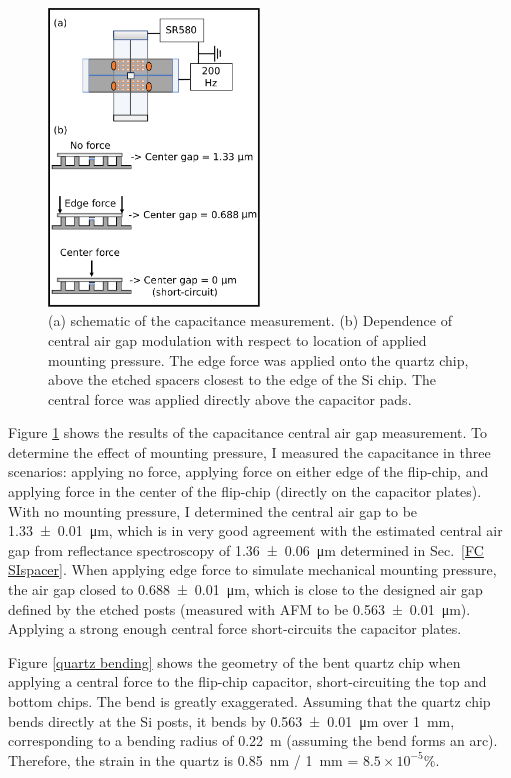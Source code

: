 \documentclass[double,12pt,1in,seploa]{beavtex}
\begin{document}
\begin{figure}
    \includegraphics[width = 0.5\textwidth]{FC capacitance measurement.pdf}
    \caption{(a) schematic of the capacitance measurement. (b) Dependence of central air gap modulation with respect to location of applied mounting pressure. The edge force was applied onto the quartz chip, above the etched spacers closest to the edge of the Si chip. The central force was applied directly above the capacitor pads.}
    \label{FC cap measurement}
\end{figure}



Figure \ref{FC cap measurement} shows the results of the capacitance central air gap measurement. To determine the effect of mounting pressure, I measured the capacitance in three scenarios: applying no force, applying force on either edge of the flip-chip, and applying force in the center of the flip-chip (directly on the capacitor plates). With no mounting pressure, I determined the central air gap to be \SI{1.33(1)}{\micro\meter}, which is in very good agreement with the estimated central air gap from reflectance spectroscopy of \SI{1.36(6)}{\micro\meter} determined in Sec.\ \ref{FC SIspacer}. When applying edge force to simulate mechanical mounting pressure, the air gap closed to  \SI{0.688(10)}{\micro\meter}, which is close to the designed air gap defined by the etched posts (measured with AFM to be \SI{0.563(10)}{\micro\meter}). Applying a strong enough central force short-circuits the capacitor plates. 

Figure \ref{quartz bending} shows the geometry of the bent quartz chip when applying a central force to the flip-chip capacitor, short-circuiting the top and bottom chips. The bend is greatly exaggerated. Assuming that the quartz chip bends directly at the Si posts, it bends by \SI{0.563(10)}{\micro\meter} over \SI{1}{\milli\meter}, corresponding to a bending radius of \SI{0.22}{\meter} (assuming the bend forms an arc). Therefore, the strain in the quartz is \SI{0.85}{\nano\meter} / \SI{1}{\milli\meter} = $8.5 \times 10^{-5} \% $.
\end{document}
